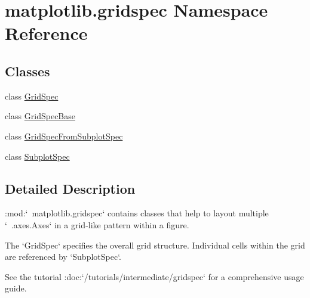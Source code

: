 \hypertarget{namespacematplotlib_1_1gridspec}{}\section{matplotlib.\+gridspec Namespace Reference}
\label{namespacematplotlib_1_1gridspec}
\subsection*{Classes}
\begin{DoxyCompactItemize}
\item 
class \hyperlink{classmatplotlib_1_1gridspec_1_1GridSpec}{Grid\+Spec}
\item 
class \hyperlink{classmatplotlib_1_1gridspec_1_1GridSpecBase}{Grid\+Spec\+Base}
\item 
class \hyperlink{classmatplotlib_1_1gridspec_1_1GridSpecFromSubplotSpec}{Grid\+Spec\+From\+Subplot\+Spec}
\item 
class \hyperlink{classmatplotlib_1_1gridspec_1_1SubplotSpec}{Subplot\+Spec}
\end{DoxyCompactItemize}


\subsection{Detailed Description}
\begin{DoxyVerb}:mod:`~matplotlib.gridspec` contains classes that help to layout multiple
`~.axes.Axes` in a grid-like pattern within a figure.

The `GridSpec` specifies the overall grid structure. Individual cells within
the grid are referenced by `SubplotSpec`\s.

See the tutorial :doc:`/tutorials/intermediate/gridspec` for a comprehensive
usage guide.
\end{DoxyVerb}
 